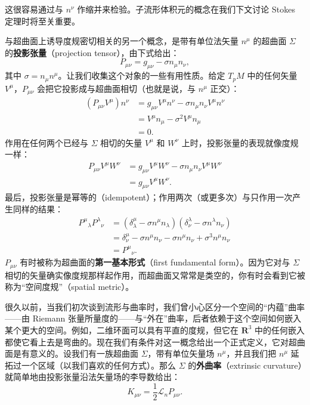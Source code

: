 这很容易通过与 $n^\nu$ 作缩并来检验。子流形体积元的概念在我们下文讨论 Stokes 定理时将至关重要。

与超曲面上诱导度规密切相关的另一个概念，是带有单位法矢量 $n^\mu$ 的超曲面 $\Sigma$ 的\textbf{投影张量}（projection tensor），由下式给出：
\begin{equation*}
P_{\mu\nu} = g_{\mu\nu} - \sigma n_\mu n_\nu,
\tag{D.37}
\end{equation*}
其中 $\sigma = n_\mu n^\mu$。让我们收集这个对象的一些有用性质。给定 $T_pM$ 中的任何矢量 $V^\mu$，$P_{\mu\nu}$ 会把它投影成与超曲面相切（也就是说，与 $n^\mu$ 正交）：
\begin{align*}
(P_{\mu\nu} V^\mu) n^\nu &= g_{\mu\nu} V^\mu n^\nu - \sigma n_\mu n_\nu V^\mu n^\nu \\
&= V^\mu n_\mu - \sigma^2 V^\mu n_\mu \\
&= 0.
\tag{D.38}
\end{align*}
作用在任何两个已经与 $\Sigma$ 相切的矢量 $V^\mu$ 和 $W^\nu$ 上时，投影张量的表现就像度规一样：
\begin{align*}
P_{\mu\nu} V^\mu W^\nu &= g_{\mu\nu} V^\mu W^\nu - \sigma n_\mu n_\nu V^\mu W^\nu \\
&= g_{\mu\nu} V^\mu W^\nu.
\tag{D.39}
\end{align*}
最后，投影张量是幂等的（idempotent）；作用两次（或更多次）与只作用一次产生同样的结果：
\begin{align*}
P^\mu{}_\lambda P^\lambda{}_\nu &= (\delta^\mu_\lambda - \sigma n^\mu n_\lambda) (\delta^\lambda_\nu - \sigma n^\lambda n_\nu) \\
&= \delta^\mu_\nu - \sigma n^\mu n_\nu - \sigma n^\mu n_\nu + \sigma^3 n^\mu n_\nu \\
&= P^\mu{}_\nu.
\tag{D.40}
\end{align*}
$P_{\mu\nu}$ 有时被称为超曲面的\textbf{第一基本形式}（first fundamental form）。因为它对与 $\Sigma$ 相切的矢量确实像度规那样起作用，而超曲面又常常是类空的，你有时会看到它被称为“空间度规”（spatial metric）。

很久以前，当我们初次谈到流形与曲率时，我们曾小心区分一个空间的“内蕴”曲率——由 Riemann 张量所量度的——与“外在”曲率，后者依赖于这个空间如何嵌入某个更大的空间。例如，二维环面可以具有平直的度规，但它在 $\mathbf{R}^3$ 中的任何嵌入都使它看上去是弯曲的。现在我们有条件对这一概念给出一个正式定义，它对超曲面是有意义的。设我们有一族超曲面 $\Sigma$，带有单位矢量场 $n^\mu$，并且我们把 $n^\mu$ 延拓过一个区域（以我们喜欢的任何方式）。那么 $\Sigma$ 的\textbf{外曲率}（extrinsic curvature）就简单地由投影张量沿法矢量场的李导数给出：
\begin{equation*}
K_{\mu\nu} = \frac{1}{2} \mathcal{L}_n P_{\mu\nu}.
\tag{D.41}
\end{equation*}

